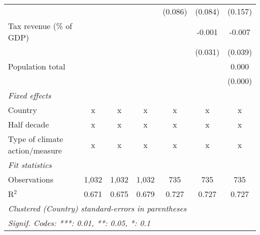 \begin{tabular}{lcccccc}
                                                  &               &                &                & (0.086)        & (0.084)        & (0.157)\\   
   Tax revenue (\% of GDP)                        &               &                &                &                & -0.001         & -0.007\\   
                                                  &               &                &                &                & (0.031)        & (0.039)\\   
   Population total                               &               &                &                &                &                & 0.000\\   
                                                  &               &                &                &                &                & (0.000)\\   
   \emph{Fixed effects}\\
   Country                                        & x             & x              & x              & x              & x              & x\\  
   Half decade                                    & x             & x              & x              & x              & x              & x\\  
   Type of climate action/measure                 & x             & x              & x              & x              & x              & x\\  
   \midrule \emph{Fit statistics}\\
   Observations                                   & 1,032         & 1,032          & 1,032          & 735            & 735            & 735\\  
   R$^2$                                          & 0.671         & 0.675          & 0.679          & 0.727          & 0.727          & 0.727\\  
   \midrule
   \multicolumn{7}{l}{\emph{Clustered (Country) standard-errors in parentheses}}\\
   \multicolumn{7}{l}{\emph{Signif. Codes: ***: 0.01, **: 0.05, *: 0.1}}\\
\end{tabular}
\par\endgroup



